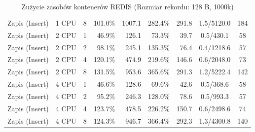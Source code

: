 \begin{table}[ht]
{\begin{tabular}{llcrrrrcc}
Zapis (Insert) & 1 CPU & 8 & 101.0\% & 1007.1 & 282.4\% & 291.8 & 1.5/5120.0 & 184 \\
Zapis (Insert) & 2 CPU & 1 & 46.9\% & 126.1 & 73.3\% & 39.7 & 0.5/430.1 & 58 \\
Zapis (Insert) & 2 CPU & 2 & 98.1\% & 245.1 & 135.3\% & 76.4 & 0.4/1218.6 & 57 \\
Zapis (Insert) & 2 CPU & 4 & 120.1\% & 474.9 & 219.6\% & 146.6 & 0.6/2048.0 & 73 \\
Zapis (Insert) & 2 CPU & 8 & 131.5\% & 953.6 & 365.6\% & 291.3 & 1.2/5222.4 & 142 \\
Zapis (Insert) & 4 CPU & 1 & 46.6\% & 128.6 & 69.6\% & 42.6 & 0.5/368.6 & 58 \\
Zapis (Insert) & 4 CPU & 2 & 95.2\% & 246.3 & 128.0\% & 78.6 & 0.5/993.3 & 57 \\
Zapis (Insert) & 4 CPU & 4 & 123.7\% & 478.5 & 226.2\% & 150.7 & 0.6/2498.6 & 74 \\
Zapis (Insert) & 4 CPU & 8 & 124.3\% & 946.7 & 366.4\% & 292.3 & 1.3/4300.8 & 140 \\
\bottomrule
\end{tabular}%
}
\caption{Zużycie zasobów kontenerów REDIS (Rozmiar rekordu: 128 B, 1000k)}
\label{tab:resources_redis_small_1000000}
\end{table}
